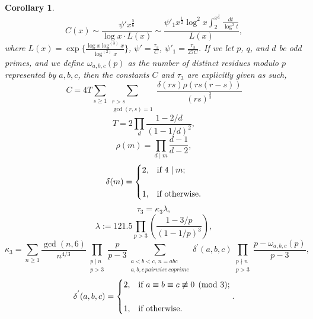 \documentclass[11pt]{article}
\theoremstyle{plain}
\newtheorem{corollary}[subsubsection]{Corollary}
\theoremstyle{definition}
\theoremstyle{remark}
\numberwithin{equation}{subsection}
\begin{document}
\begin{corollary} \label{result2}
\begin{equation} \label{600}
C(x) \sim \frac{\psi'{x^{\frac{5}{6}}}}{\log x \cdot L(x)} \sim \frac{{\psi'_{1}} {x^{\frac{1}{2}}} \log^2 x \displaystyle\int_2^{x^{\frac{1}{3}}}\frac{dt}{\log^3 t}}{L(x)},
\end{equation}
where $L(x)=\exp\{\frac{\log x \log^{(3)} x}{\log^{(2)} x}\}$, $\psi' = \frac{\tau_3}{C}$, $\psi'_1 = \frac{\tau_3}{27C}$. If we let $p$, $q$, and $d$ be odd primes, and we define $\omega_{a,b,c}(p)$ as the number of distinct residues modulo $p$ represented by $a,b,c$, then the constants $C$ and $\tau_3$ are explicitly given as such,
\begin{equation}
C = 	4T{\sum_{s \ge 1}}
			\sum_{\substack{r > s \\ \gcd(r,s)=1}}
			\frac{\delta(rs)\rho(rs(r-s)) }{ (rs)^{\frac{3}{2} }}
\end{equation}
\begin{equation*}
T = 2{\prod_d}{\frac{1-2/d}{(1-1/d)^{2}}},
\end{equation*}
\begin{equation*}
\rho(m) = {\prod_{d \mid m}}{\frac{d-1}{d-2}},
\end{equation*}
\begin{equation*}
\delta(m) = \begin{cases}  2, & $if {$4\mid m$}$; \\
\\
1, & $if otherwise.$
\end{cases}
\end{equation*}
\begin{equation}
\tau_3 = {\kappa_3}{\lambda},
\end{equation}
\begin{equation*}
\lambda := {121.5}{\prod_{p>3}}\left(\frac{1-{3/p}}{(1-{1/p})^3}\right),
\end{equation*}
\begin{equation*}
\kappa_3 = {\sum_{n \ge 1}}
		{\frac{\gcd(n,6)}{n^{4/3}}}
		{\prod_{\substack{{p \mid n}\\{p > 3}}}}
		{\frac{p}{p-3}}
		{\sum_{\substack{{a<b<c, \,n=abc}\\{a,b,c \, pairwise \, coprime}}}}
		{\delta^{'}(a,b,c)}
		{\prod_{\substack{{p\nmid n}\\p>3}}}
		{\frac{p-{\omega_{a,b,c}{(p)}}}{p-3}},
\end{equation*}
\begin{equation*} \label{20}
\delta^{'}(a,b,c) = \begin{cases}  2, & $if {$a \equiv b \equiv c \not\equiv 0 \pmod 3$}$; \\
\\
1, & $if otherwise.$
\end{cases}.
\end{equation*}
\end{corollary}
\end{document}
